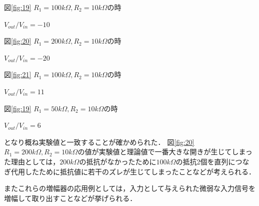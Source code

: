 \documentclass[11pt, a4paper,twocolumn]{jarticle}
\begin{document}
図\ref{fig:19} $R_1=100k\Omega,R_2=10k\Omega$の時　

$V_{out}/V_{in}=-10$

図\ref{fig:20} $R_1=200k\Omega,R_2=10k\Omega$の時　

$V_{out}/V_{in}=-20$

図\ref{fig:21} $R_1=100k\Omega,R_2=10k\Omega$の時　

$V_{out}/V_{in}=11$

図\ref{fig:19} $R_1=50k\Omega,R_2=10k\Omega$の時　

$V_{out}/V_{in}=6$

となり概ね実験値と一致することが確かめられた．
図\ref{fig:20} $R_1=200k\Omega,R_2=10k\Omega$の値が実験値と理論値で一番大きな開きが生じてしまった理由としては，$200k\Omega$の抵抗がなかったために$100k\Omega$の抵抗2個を直列につなぎ代用したために抵抗値に若干のズレが生じてしまったことなどが考えられる．

またこれらの増幅器の応用例としては，入力として与えられた微弱な入力信号を増幅して取り出すことなどが挙げられる．
\newpage
\end{document}
